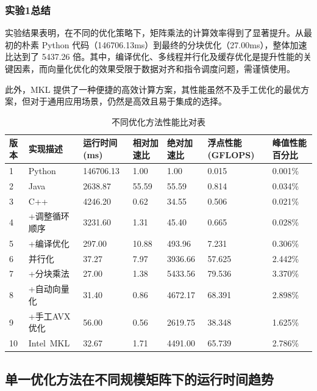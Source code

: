 \documentclass[a4paper, utf8]{ctexart}
\begin{document}
	\subsubsection{实验1总结}
	
	实验结果表明，在不同的优化策略下，矩阵乘法的计算效率得到了显著提升。从最初的朴素 Python 代码（146706.13ms）到最终的分块优化（27.00ms），整体加速比达到了 5437.26 倍。其中，编译优化、多线程并行化及缓存优化是提升性能的关键因素，而向量化优化的效果受限于数据对齐和指令调度问题，需谨慎使用。
	
	此外，MKL 提供了一种便捷的高效计算方案，其性能虽然不及手工优化的最优方案，但对于通用应用场景，仍然是高效且易于集成的选择。
	
	\begin{table}[htbp]
		\centering	\small
		\caption{不同优化方法性能比对表}
		\vspace{-.75em}
		\begin{tabular}{m{}<{\centering}|m{}<{\centering}|m{}<{\centering}|m{}<{\centering}|m{}<{\centering}|m{}<{\centering}|m{}<{\centering}}
			\toprule
			版本 & 实现描述 & 运行时间(ms) & 相对加速比 & 绝对加速比 & 浮点性能(GFLOPS) & 峰值性能百分比 \\
			\midrule
			1 & Python & 146706.13 & 1.00 & 1.00 & 0.015 & 0.001\% \\
			2 & Java & 2638.87 & 55.59 & 55.59 & 0.814 & 0.034\% \\
			3 & C++ & 4246.20 & 0.62 & 34.55 & 0.506 & 0.021\% \\
			4 & +调整循环顺序 & 3231.60 & 1.31 & 45.40 & 0.665 & 0.028\% \\
			5 & +编译优化 & 297.00 & 10.88 & 493.96 & 7.231 & 0.306\% \\
			6 & 并行化 & 37.27 & 7.97 & 3936.66 & 57.625 & 2.442\% \\
			7 & +分块乘法 & 27.00 & 1.38 & 5433.56 & 79.536 & 3.370\% \\
			8 & +自动向量化 & 31.40 & 0.86 & 4672.17 & 68.391 & 2.898\% \\
			9 & +手工AVX优化 & 56.00 & 0.56 & 2619.75 & 38.348 & 1.625\% \\
			10 & Intel\ MKL & 32.67 & 1.71 & 4491.00 & 65.739 & 2.786\% \\
			\bottomrule
		\end{tabular}
	\end{table}
	
	\subsection{单一优化方法在不同规模矩阵下的运行时间趋势}
	
\end{document}
